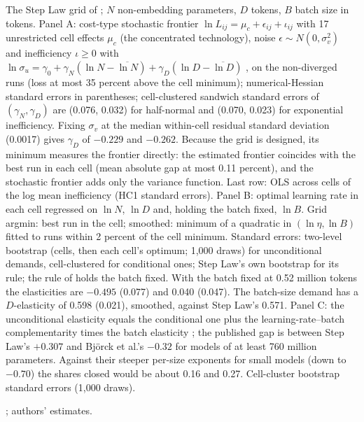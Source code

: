 \begin{table}[tp]
\par\smallskip
\begin{tablenotes}
The Step Law grid of \citet{li2025predictablea}; $N$ non-embedding parameters, $D$ tokens, $B$ batch size in tokens.
Panel A: cost-type stochastic frontier $\ln L_{ij}=\mu_c+\epsilon_{ij}+\iota_{ij}$ with 17 unrestricted cell effects
$\mu_c$ (the concentrated technology), noise $\epsilon\sim N(0,\sigma_v^2)$ and inefficiency $\iota\ge0$ with
$\ln\sigma_u=\gamma_0+\gamma_N(\ln N-\overline{\ln N})+\gamma_D(\ln D-\overline{\ln D})$ \citep{caudill1995frontier}, on
the non-diverged runs (loss at most 35 percent above the cell minimum); numerical-Hessian standard errors in
parentheses; cell-clustered sandwich standard errors of $(\gamma_N,\gamma_D)$ are (0.076, 0.032) for half-normal and
(0.070, 0.023) for exponential inefficiency. Fixing $\sigma_v$ at the median within-cell
residual standard deviation (0.0017) gives $\gamma_D$ of $-0.229$ and $-0.262$. Because the grid is designed, its
minimum measures the frontier directly: the estimated frontier coincides with the best run in each cell (mean absolute
gap at most 0.11 percent), and the stochastic frontier adds only the variance function. Last row: OLS across cells of
the log mean inefficiency (HC1 standard errors). Panel B: optimal learning rate in each cell regressed on $\ln N$,
$\ln D$ and, holding the batch fixed, $\ln B$. Grid argmin: best run in the cell; smoothed: minimum of a quadratic in
$(\ln\eta,\ln B)$ fitted to runs within 2 percent of the cell minimum. Standard errors: two-level bootstrap (cells, then
each cell's optimum; 1,000 draws) for unconditional demands, cell-clustered for conditional ones; Step Law's own
bootstrap for its rule; the rule of \citet{bjorck2024scaling} holds the batch fixed. With the batch fixed at 0.52 million tokens the elasticities are $-0.495$ (0.077) and 0.040
(0.047). The batch-size demand has a $D$-elasticity of 0.598 (0.021), smoothed, against Step Law's 0.571. Panel C:
the unconditional elasticity equals the conditional one plus the learning-rate--batch complementarity times the
batch elasticity \citep{milgrom1996lechatelier}; the published gap is between Step Law's $+0.307$ and Bj\"orck et al.'s
$-0.32$ for models of at least 760 million parameters. Against their steeper per-size exponents for small models (down
to $-0.70$) the shares closed would be about 0.16 and 0.27. Cell-cluster bootstrap standard errors (1,000 draws).
\end{tablenotes}
\begin{tablenotes}[Source]
\citet{li2025predictablea}; authors' estimates.
\end{tablenotes}
\end{table}
